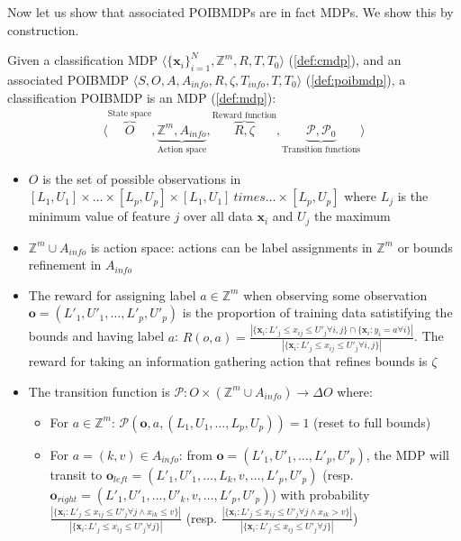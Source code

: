 Now let us show that associated POIBMDPs are in fact MDPs. We show this by construction.

\begin{definition}\label{def:cpoibmdp}
    Given a classification MDP $\langle {\{\boldsymbol{x}_i\}}_{i=1}^N, \mathbb{Z}^m, R, T, T_0 \rangle$ (\ref{def:cmdp}), and an associated POIBMDP $\langle S, O, A, A_{info}, R, \zeta, T_{info}, T, T_0\rangle$ (\ref{def:poibmdp}), a classification POIBMDP is an MDP (\ref{def:mdp}):
    \begin{align*}
        \langle \overbrace{O}^{\text{State space}}, \underbrace{\mathbb{Z}^m, A_{info}}_{\text{Action space}}, \overbrace{R, \zeta}^{\text{Reward function}}, \underbrace{\mathcal{P}, \mathcal{P}_0}_{\text{Transition functions}} \rangle
    \end{align*}
    \begin{itemize}
        \item $O$ is the set of possible observations in $[L_1, U_1] \times \dots \times [L_p, U_p] \times [L_1, U_1] \ times \dots \times [L_p, U_p] $ where $L_j$ is the minimum value of feature $j$ over all data $\boldsymbol{x}_i$ and $U_j$ the maximum
        \item $\mathbb{Z}^m \cup A_{info}$ is action space: actions can be label assignments in $\mathbb{Z}^m$ or bounds refinement in $A_{info}$
        \item The reward for assigning label $a\in \mathbb{Z}^m$ when observing some observation $\boldsymbol{o}=(L'_1, U'_1, \dots, L'_p, U'_p)$ is the proportion of training data satistifying the bounds and having label $a$: $R(o, a) = \frac{|\{\boldsymbol{x}_i: L'_j \leq x_{ij} \leq U'_j \forall i,j \} \cap \{\boldsymbol{x}_i: y_i = a \forall i \}|}{|\{\boldsymbol{x}_i: L'_j \leq x_{ij} \leq U'_j \forall i,j \}|}$. 
        The reward for taking an information gathering action that refines bounds is $\zeta$
        \item The transition function is $\mathcal{P}:O \times (\mathbb{Z}^m \cup A_{info}) \rightarrow \Delta O$ where:
        \begin{itemize}
            \item For $a \in \mathbb{Z}^m$: $\mathcal{P}(\boldsymbol{o}, a, (L_1, U_1, \dots, L_p, U_p)) = 1$ (reset to full bounds)
            \item For $a = (k, v) \in A_{info}$: from $\boldsymbol{o}=(L'_1, U'_1, \dots, L'_p, U'_p)$, the MDP will transit to $\boldsymbol{o}_{left} = (L'_1, U'_1, \dots, L_k, v, \dots, L'_p, U'_p)$ (resp. $\boldsymbol{o}_{right} = (L'_1, U'_1, \dots, U'_k, v, \dots, L'_p, U'_p)$) with probability $\frac{|\{\boldsymbol{x}_i: L'_j \leq x_{ij} \leq U'_j \forall j \land x_{ik} \leq v\}|}{|\{\boldsymbol{x}_i: L'_j \leq x_{ij} \leq U'_j \forall j\}|}$ (resp. $\frac{|\{\boldsymbol{x}_i: L'_j \leq x_{ij} \leq U'_j \forall j \land x_{ik} > v\}|}{|\{\boldsymbol{x}_i: L'_j \leq x_{ij} \leq U'_j \forall j\}|}$)
        \end{itemize}
    \end{itemize}
\end{definition}

